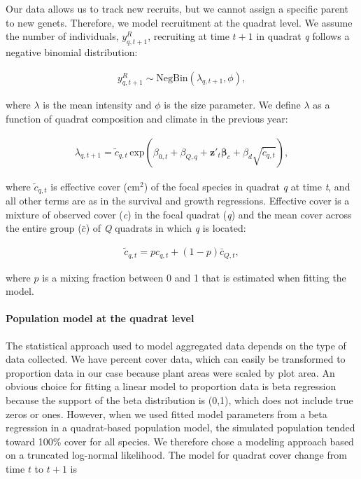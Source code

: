 \documentclass[12pt,]{article}
\begin{document}
Our data allows us to track new recruits, but we cannot assign a
specific parent to new genets. Therefore, we model recruitment at the
quadrat level. We assume the number of individuals, \(y^{R}_{q,t+1}\),
recruiting at time \(t+1\) in quadrat \emph{q} follows a negative
binomial distribution:

\vspace{-3em}\begin{align}
y^{R}_{q,t+1} \sim \text{NegBin}(\lambda_{q,t+1},\phi),
\end{align}\vspace{-3em}

where \(\lambda\) is the mean intensity and \(\phi\) is the size
parameter. We define \(\lambda\) as a function of quadrat composition
and climate in the previous year:

\vspace{-3em}\begin{align}
\lambda_{q,t+1} = \tilde{c}_{q,t} \, \text{exp}\left(\beta_{0,t} + \beta_{Q,q} + \textbf{z}'_t \boldsymbol{\beta}_c + \beta_{d}\sqrt{\tilde{c}_{q,t}}\right),
\end{align}\vspace{-3em}

where \(\tilde{c}_{q,t}\) is effective cover (\(\text{cm}^2\)) of the
focal species in quadrat \emph{q} at time \emph{t}, and all other terms
are as in the survival and growth regressions. Effective cover is a
mixture of observed cover (\emph{c}) in the focal quadrat (\emph{q}) and
the mean cover across the entire group (\(\bar{c}\)) of \emph{Q}
quadrats in which \emph{q} is located:

\vspace{-3em}\begin{align}
\tilde{c}_{q,t} = pc_{q,t} + (1-p)\bar{c}_{Q,t},
\end{align}\vspace{-3em}

where \(p\) is a mixing fraction between 0 and 1 that is estimated when
fitting the model.

\paragraph{Population model at the quadrat
level}\label{population-model-at-the-quadrat-level}

The statistical approach used to model aggregated data depends on the
type of data collected. We have percent cover data, which can easily be
transformed to proportion data in our case because plant areas were
scaled by plot area. An obvious choice for fitting a linear model to
proportion data is beta regression because the support of the beta
distribution is (0,1), which does not include true zeros or ones.
However, when we used fitted model parameters from a beta regression in
a quadrat-based population model, the simulated population tended toward
100\% cover for all species. We therefore chose a modeling approach
based on a truncated log-normal likelihood. The model for quadrat cover
change from time \(t\) to \(t+1\) is
\end{document}
